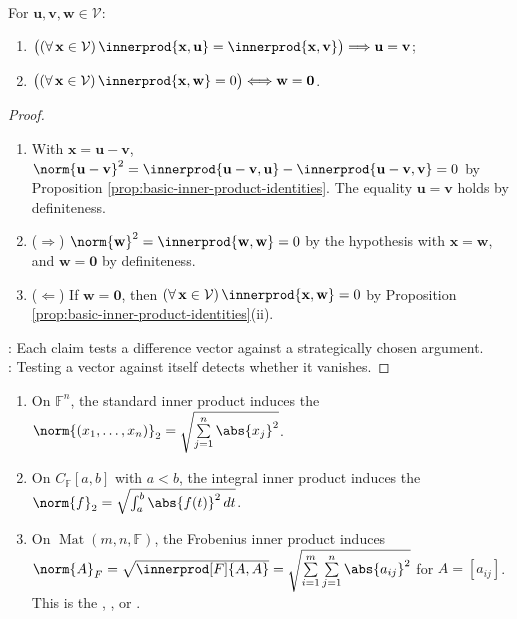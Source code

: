 \begin{lemma} \label{lem:inner-products-separate-vectors} \\
For $\mathbf{u},\mathbf{v},\mathbf{w}\in\mathcal{V}$:
\begin{enumerate}[label=(\roman*)]
\setlength{\itemsep}{0pt}
\item $\bigl((\forall\,\mathbf{x}\in\mathcal{V})\,\innerprod{\mathbf{x},\mathbf{u}}=\innerprod{\mathbf{x},\mathbf{v}}\bigr)\Longrightarrow\mathbf{u}=\mathbf{v}$;
\item $\bigl((\forall\,\mathbf{x}\in\mathcal{V})\,\innerprod{\mathbf{x},\mathbf{w}}=0\bigr)\Longleftrightarrow\mathbf{w}=\mathbf{0}$.
\end{enumerate}
\begin{proof}
\begin{enumerate}[label=(\roman*)]
\setlength{\itemsep}{0pt}
\item[$(i)$] With $\mathbf{x}=\mathbf{u}-\mathbf{v}$, $\norm{\mathbf{u}-\mathbf{v}}^2=\innerprod{\mathbf{u}-\mathbf{v},\mathbf{u}}-\innerprod{\mathbf{u}-\mathbf{v},\mathbf{v}}=0$ by Proposition \ref{prop:basic-inner-product-identities}. The equality $\mathbf{u}=\mathbf{v}$ holds by definiteness.
\item[$(ii)$] ($\Rightarrow$) $\norm{\mathbf{w}}^2=\innerprod{\mathbf{w},\mathbf{w}}=0$ by the hypothesis with $\mathbf{x}=\mathbf{w}$, and $\mathbf{w}=\mathbf{0}$ by definiteness.
\item[$(ii)$] ($\Leftarrow$) If $\mathbf{w}=\mathbf{0}$, then $(\forall\,\mathbf{x}\in\mathcal{V})\,\innerprod{\mathbf{x},\mathbf{w}}=0$ by Proposition \ref{prop:basic-inner-product-identities}(ii).
\end{enumerate}
: Each claim tests a difference vector against a strategically chosen argument.\\
: Testing a vector against itself detects whether it vanishes.
\end{proof}
\end{lemma}

\begin{example} \label{ex:norms-induced-by-inner-products} 
\begin{enumerate}[label=(\roman*)]
\setlength{\itemsep}{0pt}
\item On $\mathbb{F}^n$, the standard inner product induces the  $\norm{(x_1,\ldots,x_n)}_2=\sqrt{\sum\limits_{j=1}^{n}\abs{x_j}^2}$.
\item On $C_{\mathbb{F}}[a,b]$ with $a<b$, the integral inner product induces the  $\norm{f}_2=\sqrt{\int_a^b\abs{f(t)}^2\,dt}$.
\item On $\operatorname{Mat}(m,n,\mathbb{F})$, the Frobenius inner product induces $\norm{A}_F=\sqrt{\innerprod[F]{A,A}}=\sqrt{\sum\limits_{i=1}^{m}\sum\limits_{j=1}^{n}\abs{a_{ij}}^2}$ for $A=[a_{ij}]$.\\
This is the , , or .
\end{enumerate}
\end{example}

